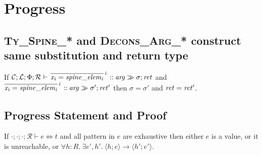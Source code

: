 \documentclass[11pt]{article}%
\newcommand{\ctxR}{\mathcal{R}}%
\newcommand{\stepsto}{\longrightarrow}%
\newcommand{\sych}{\Leftrightarrow}%
\newcommand{\hconf}[2]{\langle #1 ; #2 \rangle}%
\begin{document}
\section{Progress}\label{sec:progress}

\subsection{\textsc{Ty\_Spine\_*} and \textsc{Decons\_Arg\_*} construct same
substitution and return type}\label{subsec:spine_decons_same}

If $\mathcal{C}  ;  \mathcal{L}  ;  \Phi  ;  \mathcal{R}  \vdash \, \overline{\mathit{x_{\mathit{i}}}  =  \mathit{spine\_elem_{\mathit{i}}}}^{\,\mathit{i}} \, \mathbin{ {:} {:} }  \mathit{arg}  \gg  \sigma  ;  \mathit{ret}$ and
$\overline{\mathit{x_{\mathit{i}}}  =  \mathit{spine\_elem_{\mathit{i}}}}^{\,\mathit{i}} \, \mathbin{ {:} {:} }  \mathit{arg}  \gg  \sigma'  ;  \mathit{ret'}$ then $\sigma =
\sigma'$ and $\mathit{ret} = \mathit{ret'}$.


\subsection{Progress Statement and Proof}\label{subsec:progress}

If $\cdot ; \cdot ; \cdot ; \ctxR \vdash e \sych t$ and all pattern in $e$ are
exhaustive then either $e$ is a value, or it is unreachable, or $\forall h
: R.\ \exists e' , h' .\ \hconf{h}{e} \stepsto \hconf{h'}{e'}$.
\end{document}

